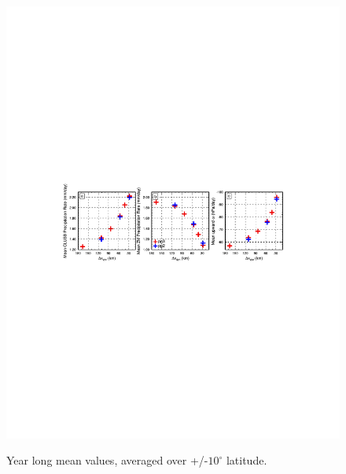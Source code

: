 \documentclass{agujournal}
\begin{document}
\begin{figure}[t]
\begin{center}
\noindent\includegraphics[width=30pc,angle=0]{figs/panel_diags.pdf}\\
\end{center}
\caption{Year long mean values, averaged over +/-$10^{\circ}$ latitude.}
\label{fig:diags}
\end{figure}


\end{document}
